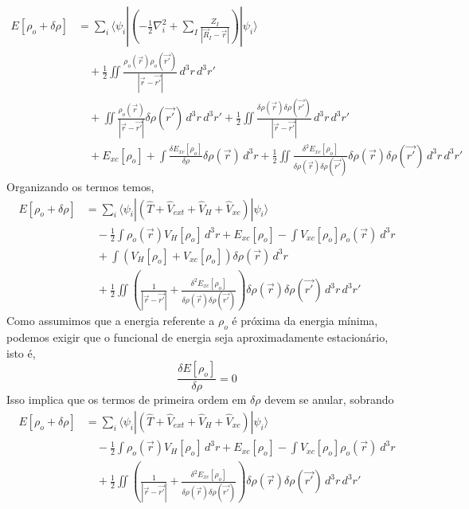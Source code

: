 \begin{equation}
\begin{aligned}
E[\rho_o + \delta\rho]
&=
\sum_i \langle\psi_i|
\left(
-\frac{1}{2} \nabla_i^2
+ \sum_I\frac{Z_I}{|\vec{R}_I-\vec{r}|}
\right)
|\psi_i\rangle
\\
&\quad
+ \frac{1}{2}\iint
\frac{\rho_o(\vec{r})\rho_o(\vec{r'})}
{|\vec{r}-\vec{r'}|}
\,d^3r\,d^3r'
\\
&\quad
+ \iint
\frac{\rho_o(\vec{r})}
{|\vec{r}-\vec{r'}|}
\delta\rho(\vec{r'})
\,d^3r\,d^3r'
+ \frac{1}{2}\iint
\frac{\delta\rho(\vec{r})\delta\rho(\vec{r'})}
{|\vec{r}-\vec{r'}|}
\,d^3r\,d^3r'
\\
&\quad
+ E_{xc}[\rho_o]
+ \int
\frac{\delta E_{xc}[\rho_o]}{\delta \rho}\delta\rho(\vec{r})
\,d^3r
+ \frac{1}{2} \iint
\frac{\delta^2 E_{xc}[\rho_o]}
{\delta\rho(\vec{r})\delta\rho(\vec{r'})}\delta\rho(\vec{r})\delta\rho(\vec{r'})
\,d^3r\,d^3r'
\end{aligned}
\end{equation}
Organizando os termos temos,
\begin{equation}
\begin{aligned}
E[\rho_o + \delta\rho]
&=
\sum_i \langle\psi_i|
\left(
\hat T + \hat V_{ext} + \hat V_H + \hat V_{xc}
\right)
|\psi_i\rangle
\\
&\quad
- \frac{1}{2}\int
\rho_o(\vec{r})V_{H}[\rho_o] \,d^3r + E_{xc}[\rho_o] - \int V_{xc}[\rho_o] \rho_o(\vec{r}) ~d^3 r 
\\
&\quad
+ \int \left(
V_H[\rho_o] + V_{xc}[\rho_o] \right)\delta\rho(\vec{r})
\,d^3r
\\
&\quad
+ \frac{1}{2}\iint \left(
\frac{1}{|\vec{r}-\vec{r'}|} + \frac{\delta^2 E_{xc}[\rho_o]}{\delta\rho(\vec{r})\delta\rho(\vec{r'})}
\right) \delta\rho(\vec{r})\delta\rho(\vec{r'})
\,d^3r\,d^3r'
\end{aligned}
\end{equation}
Como assumimos que a energia referente a $\rho_o$ é próxima da energia mínima, podemos exigir que o funcional de energia seja aproximadamente estacionário, isto é,
\begin{equation}
    \frac{\delta E[\rho_o]}{\delta \rho} = 0
\end{equation}
Isso implica que os termos de primeira ordem em $\delta\rho$ devem se anular, sobrando
\begin{equation}
\begin{aligned}
E[\rho_o + \delta\rho]
&=
\sum_i \langle\psi_i|
\left(
\hat T + \hat V_{ext} + \hat V_H + \hat V_{xc}
\right)
|\psi_i\rangle
\\
&\quad
- \frac{1}{2}\int
\rho_o(\vec{r})V_{H}[\rho_o] \,d^3r + E_{xc}[\rho_o] - \int V_{xc}[\rho_o] \rho_o(\vec{r}) ~d^3 r 
\\
&\quad
+ \frac{1}{2}\iint \left(
\frac{1}{|\vec{r}-\vec{r'}|} + \frac{\delta^2 E_{xc}[\rho_o]}{\delta\rho(\vec{r})\delta\rho(\vec{r'})}
\right) \delta\rho(\vec{r})\delta\rho(\vec{r'})
\,d^3r\,d^3r'
\end{aligned}
\end{equation}
